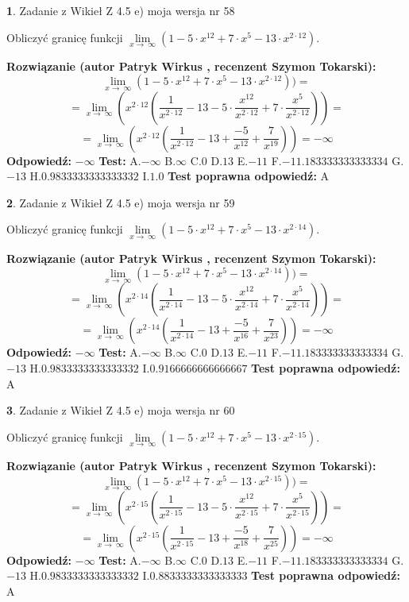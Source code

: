 \documentclass[12pt, a4paper]{article}
\theoremstyle{definition} %
\newtheorem{zad}{}
\newcommand{\zadStart}[1]{\begin{zad}#1\newline}
\newcommand{\zadStop}{\end{zad}}
\newcommand{\rozwStart}[2]{\noindent \textbf{Rozwiązanie (autor #1 , recenzent #2): }\newline}
\newcommand{\rozwStop}{\newline}
\newcommand{\odpStart}{\noindent \textbf{Odpowiedź:}\newline}
\newcommand{\odpStop}{\newline}
\newcommand{\testStart}{\noindent \textbf{Test:}\newline}
\newcommand{\testStop}{\newline}
\newcommand{\kluczStart}{\noindent \textbf{Test poprawna odpowiedź:}\newline}
\newcommand{\kluczStop}{\newline}
\begin{document}
\zadStart{Zadanie z Wikieł Z 4.5 e) moja wersja nr 58}


Obliczyć granicę funkcji  $\lim\limits_{x\to\ \infty}(1 - 5 \cdot x^{12}+7 \cdot x^{5}- 13 \cdot x^{2\cdot12})$.
\zadStop
\rozwStart{Patryk Wirkus}{Szymon Tokarski}
$$\lim\limits_{x\to\ \infty}(1 - 5 \cdot x^{12}+7 \cdot x^{5}- 13 \cdot x^{2\cdot12}))=$$
$$=\lim\limits_{x\to\ \infty}(x^{2\cdot12}(\frac{1}{x^{2\cdot12}}-13 -5 \cdot \frac{x^{12}}{x^{2\cdot12}}+7 \cdot \frac{x^{5}}{x^{2\cdot12}}))=$$
$$=\lim\limits_{x\to\ \infty}(x^{2\cdot12}(\frac{1}{x^{2\cdot12}}-13 + \frac{-5}{x^{12}}+ \frac{7}{x^{19}}))=-\infty$$
\rozwStop
\odpStart
$-\infty$
\odpStop
\testStart
A.$-\infty$ B.$\infty$ C.$0$ D.$13$ E.$-11$
F.$-11.183333333333334$ G.$-13$
H.$0.9833333333333332$
I.$1.0$
\testStop
\kluczStart
A
\kluczStop



\zadStart{Zadanie z Wikieł Z 4.5 e) moja wersja nr 59}


Obliczyć granicę funkcji  $\lim\limits_{x\to\ \infty}(1 - 5 \cdot x^{12}+7 \cdot x^{5}- 13 \cdot x^{2\cdot14})$.
\zadStop
\rozwStart{Patryk Wirkus}{Szymon Tokarski}
$$\lim\limits_{x\to\ \infty}(1 - 5 \cdot x^{12}+7 \cdot x^{5}- 13 \cdot x^{2\cdot14}))=$$
$$=\lim\limits_{x\to\ \infty}(x^{2\cdot14}(\frac{1}{x^{2\cdot14}}-13 -5 \cdot \frac{x^{12}}{x^{2\cdot14}}+7 \cdot \frac{x^{5}}{x^{2\cdot14}}))=$$
$$=\lim\limits_{x\to\ \infty}(x^{2\cdot14}(\frac{1}{x^{2\cdot14}}-13 + \frac{-5}{x^{16}}+ \frac{7}{x^{23}}))=-\infty$$
\rozwStop
\odpStart
$-\infty$
\odpStop
\testStart
A.$-\infty$ B.$\infty$ C.$0$ D.$13$ E.$-11$
F.$-11.183333333333334$ G.$-13$
H.$0.9833333333333332$
I.$0.9166666666666667$
\testStop
\kluczStart
A
\kluczStop



\zadStart{Zadanie z Wikieł Z 4.5 e) moja wersja nr 60}


Obliczyć granicę funkcji  $\lim\limits_{x\to\ \infty}(1 - 5 \cdot x^{12}+7 \cdot x^{5}- 13 \cdot x^{2\cdot15})$.
\zadStop
\rozwStart{Patryk Wirkus}{Szymon Tokarski}
$$\lim\limits_{x\to\ \infty}(1 - 5 \cdot x^{12}+7 \cdot x^{5}- 13 \cdot x^{2\cdot15}))=$$
$$=\lim\limits_{x\to\ \infty}(x^{2\cdot15}(\frac{1}{x^{2\cdot15}}-13 -5 \cdot \frac{x^{12}}{x^{2\cdot15}}+7 \cdot \frac{x^{5}}{x^{2\cdot15}}))=$$
$$=\lim\limits_{x\to\ \infty}(x^{2\cdot15}(\frac{1}{x^{2\cdot15}}-13 + \frac{-5}{x^{18}}+ \frac{7}{x^{25}}))=-\infty$$
\rozwStop
\odpStart
$-\infty$
\odpStop
\testStart
A.$-\infty$ B.$\infty$ C.$0$ D.$13$ E.$-11$
F.$-11.183333333333334$ G.$-13$
H.$0.9833333333333332$
I.$0.8833333333333333$
\testStop
\kluczStart
A
\kluczStop
\end{document}
